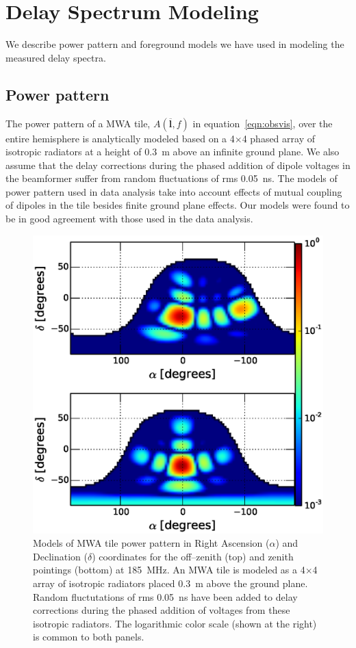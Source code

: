\documentclass[preprint2,iop,numberedappendix]{emulateapj}
\begin{document}
\section{Delay Spectrum Modeling}\label{sec:modeling}

We describe power pattern and foreground models we have used in modeling the measured delay spectra. 

\subsection{Power pattern}\label{sec:power_pattern}

The power pattern of a MWA tile, $A(\overline{\mathbf{l}},f)$ in equation~\ref{eqn:obsvis}, over the entire hemisphere is analytically modeled based on a 4$\times$4 phased array of isotropic radiators at a height of 0.3~m above an infinite ground plane. We also assume that the delay corrections during the phased addition of dipole voltages in the beamformer suffer from random fluctuations of rms 0.05~ns. The models of power pattern used in data analysis take into account effects of mutual coupling of dipoles in the tile besides finite ground plane effects. Our models were found to be in good agreement with those used in the data analysis. 

\begin{figure}[htb]
\centering
\includegraphics[width=\linewidth]{figures/v1_0/delta_array_powerpattern_0.3m_ground_custom.eps}
\caption{Models of MWA tile power pattern in Right Ascension ($\alpha$) and Declination ($\delta$) coordinates for the off--zenith (top) and zenith pointings (bottom) at 185~MHz. An MWA tile is modeled as a 4$\times$4 array of isotropic radiators placed 0.3~m above the ground plane. Random fluctutations of rms 0.05~ns have been added to delay corrections during the phased addition of voltages from these isotropic radiators. The logarithmic color scale (shown at the right) is common to both panels. \label{fig:power_pattern}}
\end{figure}
\end{document}

